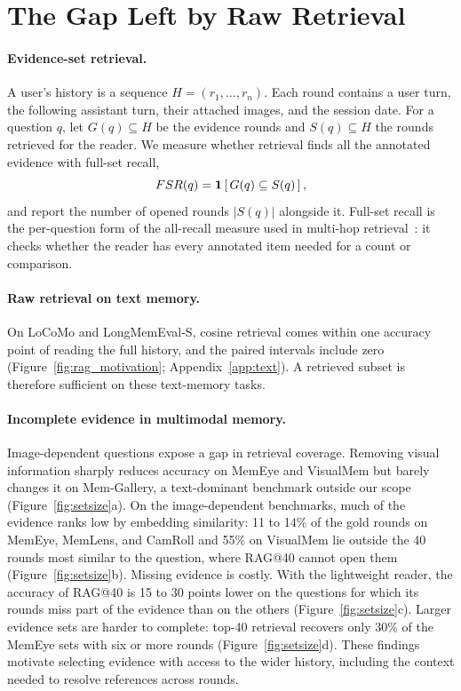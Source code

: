 \section{The Gap Left by Raw Retrieval}
\label{sec:problem}

\paragraph{Evidence-set retrieval.} A user's history is a sequence $H=(r_1,\dots,r_n)$. Each round contains a user turn, the following assistant turn, their attached images, and the session date. For a question $q$, let $G(q)\subseteq H$ be the evidence rounds and $S(q)\subseteq H$ the rounds retrieved for the reader. We measure whether retrieval finds all the annotated evidence with full-set recall,
\begin{equation}
FSR(q)=\mathbf{1}\left[\,G(q)\subseteq S(q)\,\right],
\label{eq:fsr}
\end{equation}
and report the number of opened rounds $|S(q)|$ alongside it. Full-set recall is the per-question form of the all-recall measure used in multi-hop retrieval~\citep{gutierrez2024hipporag}: it checks whether the reader has every annotated item needed for a count or comparison.

\paragraph{Raw retrieval on text memory.} On LoCoMo and LongMemEval-S, cosine retrieval comes within one accuracy point of reading the full history, and the paired intervals include zero (Figure~\ref{fig:rag_motivation}; Appendix~\ref{app:text}). A retrieved subset is therefore sufficient on these text-memory tasks.

\paragraph{Incomplete evidence in multimodal memory.} Image-dependent questions expose a gap in retrieval coverage. Removing visual information sharply reduces accuracy on MemEye and VisualMem but barely changes it on Mem-Gallery, a text-dominant benchmark outside our scope (Figure~\ref{fig:setsize}a). On the image-dependent benchmarks, much of the evidence ranks low by embedding similarity: 11 to 14\% of the gold rounds on MemEye, MemLens, and CamRoll and 55\% on VisualMem lie outside the 40 rounds most similar to the question, where RAG@40 cannot open them (Figure~\ref{fig:setsize}b). Missing evidence is costly. With the lightweight reader, the accuracy of RAG@40 is 15 to 30 points lower on the questions for which its rounds miss part of the evidence than on the others (Figure~\ref{fig:setsize}c). Larger evidence sets are harder to complete: top-40 retrieval recovers only 30\% of the MemEye sets with six or more rounds (Figure~\ref{fig:setsize}d). These findings motivate selecting evidence with access to the wider history, including the context needed to resolve references across rounds.

